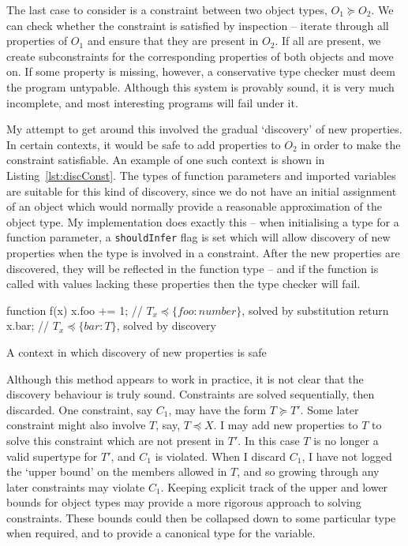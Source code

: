\documentclass[12pt,a4paper,twoside,openright]{report}
\theoremstyle{definition}
\theoremstyle{dotless}
\newcommand*{\js}{\texttt}
\begin{document}
The last case to consider is a constraint between two object types, $O_1\succeq
O_2$. We can check whether the constraint is satisfied by inspection -- iterate
through all properties of $O_1$ and ensure that they are present in $O_2$. If
all are present, we create subconstraints for the corresponding properties of
both objects and move on.  If some property is missing, however, a conservative
type checker must deem the program untypable. Although this system is provably
sound, it is very much incomplete, and most interesting programs will fail under it.

My attempt to get around this involved the gradual `discovery' of new properties.
In certain contexts, it would be safe to add properties to $O_2$ in order to make the
constraint satisfiable. An example of one such context is shown in Listing~\ref{lst:discConst}.
The types of function parameters and imported variables are suitable for this kind of discovery, since 
we do not have an initial assignment of an object which would normally provide a reasonable
approximation of the object type. My implementation does exactly this -- when initialising a type
for a function parameter, a \js{shouldInfer} flag is set which will allow discovery 
of new properties when the type is involved in a constraint. After the new properties are 
discovered, they will be reflected in the function type -- and if the function is called with 
values lacking these properties then the type checker will fail.

\begin{listing}
  \begin{jscript}
	function f(x) {
	  x.foo += 1;   // $T_x \preceq\{foo:number\}$, solved by substitution
	  return x.bar; // $T_x \preceq\{bar:T\}$, solved by discovery
	}
  \end{jscript}
  \caption{A context in which discovery of new properties is safe}
  \label{lst:discConst}
\end{listing}

Although this method appears to work in practice, it is not clear that the
discovery behaviour is truly sound. Constraints are solved sequentially, then
discarded. One constraint, say $C_1$, may have the form $T\succeq T'$. Some
later constraint might also involve $T$, say, $T\preceq X$.  I may add new
properties to $T$ to solve this constraint which are not present in $T'$. In
this case $T$ is no longer a valid supertype for $T'$, and $C_1$ is violated.
When I discard $C_1$, I have not logged the `upper bound' on the members
allowed in $T$, and so growing through any later constraints may violate $C_1$.
Keeping explicit track of the upper and lower bounds for object types may
provide a more rigorous approach to solving constraints. These bounds could
then be collapsed down to some particular type when required, and to provide a
canonical type for the variable.
\end{document}
